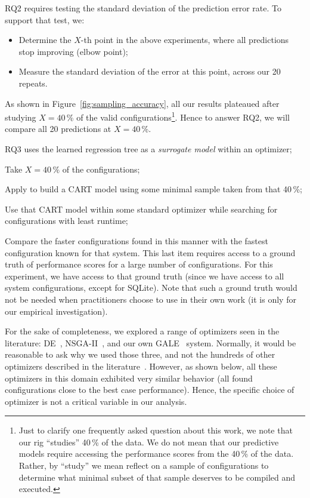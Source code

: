 RQ2 requires testing the standard deviation of the prediction error rate. To support that test, we:
\begin{itemize}
\item Determine the $X$-th point in the above experiments, where all predictions stop improving (elbow point);
\item Measure the standard deviation of the error at this point, across our 20 repeats.
\end{itemize}
As shown in Figure~\ref{fig:sampling_accuracy}, all our results plateaued after studying $X=40$\,\% of the valid configurations\footnote{Just to clarify one frequently asked question about this work, we note
that our rig ``studies'' 40\,\% of the data. We do not mean that our predictive models
 require accessing the performance scores from the 40\,\% of the data. Rather, by ``study'' we mean   reflect 
 on a sample of configurations to determine what minimal subset of that
sample deserves to be compiled and executed.}.
 Hence to answer { RQ2}, we will compare all 20 predictions at $X=40$\,\%.
 
{ RQ3}   uses the learned regression tree as a {\em surrogate model} within an optimizer; 
\bi
\item Take   $X=40\,\%$ of the configurations;
\item Apply \what to build a CART model using some minimal sample taken from that 40\,\%;
\item Use that CART model within some standard optimizer while searching for 
configurations with least runtime;
\item  Compare the faster configurations found in this manner with the fastest configuration
known for that system.
\ei
This last item requires access to a ground truth of performance scores for a  
large number of configurations. For this experiment, we have access to that ground truth
(since we have access to all system configurations, except for SQLite). Note that such a ground truth
would not be needed when practitioners choose to use \what in their own work (it is only for our empirical investigation).


For the sake of completeness, we explored
a range of optimizers seen in the   literature:  DE~\cite{storn1997differential}, NSGA-II~\cite{deb00afast},
and our own GALE~\cite{krall2014gale,zuluaga2013active} system.   Normally,
it would be  reasonable to ask
why we used those three, and not the hundreds of other 
optimizers described in the literature~\cite{fletcher13,harman12}. However,
as shown below, all these optimizers in this
domain exhibited  very similar
behavior (all found configurations close to the
best case performance). Hence, the specific
choice of optimizer is not a critical
variable in  our analysis.


